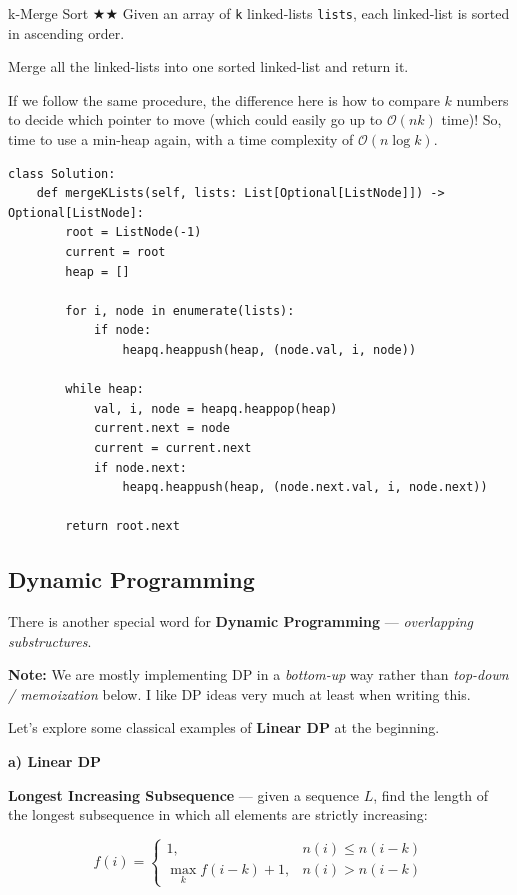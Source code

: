 \documentclass{article}
\begin{document}
\begin{Question}{k-Merge Sort $\bigstar$$\bigstar$}
Given an array of \texttt{k} linked-lists \texttt{lists}, each linked-list is sorted in ascending order.

Merge all the linked-lists into one sorted linked-list and return it.
\end{Question}

If we follow the same procedure, the difference here is how to compare $k$ numbers to decide which pointer to move (which could easily go up to $\mathcal O(nk)$ time)! So, time to use a min-heap again, with a time complexity of $\mathcal O(n\log k)$.

\begin{lstlisting}[style=python]
class Solution:
    def mergeKLists(self, lists: List[Optional[ListNode]]) -> Optional[ListNode]:
        root = ListNode(-1)
        current = root
        heap = []
        
        for i, node in enumerate(lists):
            if node:
                heapq.heappush(heap, (node.val, i, node))
                
        while heap:
            val, i, node = heapq.heappop(heap)
            current.next = node
            current = current.next
            if node.next:
                heapq.heappush(heap, (node.next.val, i, node.next))
                
        return root.next
\end{lstlisting}



\subsection{Dynamic Programming}

There is another special word for \textbf{Dynamic Programming} --- \emph{overlapping substructures}.

\textbf{Note:} We are mostly implementing DP in a \emph{bottom-up} way rather than \emph{top-down / memoization} below. I like DP ideas very much at least when writing this.

Let's explore some classical examples of \textbf{Linear DP} at the beginning.

\textbf{a) Linear DP}

\textbf{Longest Increasing Subsequence} --- given a sequence $L$, find the length of the longest subsequence in which all elements are strictly increasing:

$$
f(i)=
\begin{cases}
1, & n(i) \le n(i-k) \\
\displaystyle\max_k f(i-k)+1, & n(i)>n(i-k)
\end{cases}
$$
\end{document}
